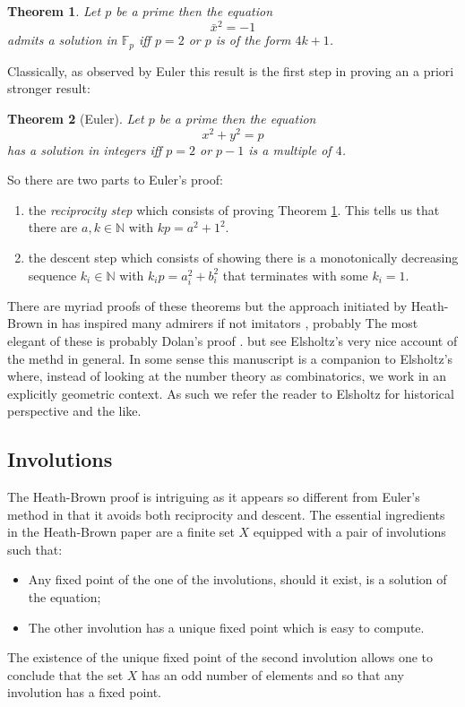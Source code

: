 \documentclass[12pt,a4paper]{amsart}
\newtheorem{thm}{Theorem}[section]
\def\fp{\mathbb{F}_p}
\begin{document}
\begin{thm}\label{triv}
Let $p$ be a prime then the equation
$$\bar{x}^2 = -1$$
admits a solution in $\fp$ iff 
$p =2$ or $p$ is of the form $4k+1$.
\end{thm}

Classically, as observed by Euler this result is the first step in proving an a priori stronger result:


\begin{thm}[Euler]\label{main}
Let $p$ be a prime then the equation
$$x^2 + y^2 = p $$
has a solution in integers  
iff  $p =2$ or $p-1$ is a multiple of $4$.
\end{thm}

\noindent
So there are two parts to Euler's proof:
\begin{enumerate}
	\item the \textit{reciprocity step} which consists of
		proving Theorem \ref{triv}. This tells us
		that there are $a,k \in \mathbb{N}$ with $kp = a^2 +1^2$.
	\item the {descent step} which consists of showing
		there is a  monotonically decreasing sequence
		$k_i \in \mathbb{N}$ with $k_ip = a_i^2 +b_i^2$
		that terminates with some $k_i=1$.
\end{enumerate}

There are myriad proofs of these theorems but the approach initiated
by Heath-Brown in \cite{heath} has inspired many admirers if not
imitators \cite{generalov, jackson,northshield, dubach}, probably
The most elegant of these is probably Dolan's proof \cite{dolan}.
but see Elsholtz's very nice account \cite{elsholtz} of the methd in
general. In some sense this manuscript is a companion to Elsholtz's
where, instead of looking at the number theory as combinatorics, we
work in an explicitly geometric context. As such we refer the reader
to Elsholtz for historical perspective and the like. 


\subsection{Involutions}

The Heath-Brown proof is intriguing as it appears so different from
Euler's method in that it avoids both reciprocity and descent.
The essential ingredients in the Heath-Brown paper are
a finite set $X$ equipped with a pair of involutions such that:


\begin{itemize}
	\item Any fixed point of the one of the involutions,
		should it exist, is a solution of the equation;
	\item The other involution has a unique fixed point which is easy to compute.
\end{itemize}
\noindent
The existence of the unique fixed point of the second involution
allows one to conclude that the set $X$ has an odd number of elements
and so that any involution has a fixed point.
\end{document}
